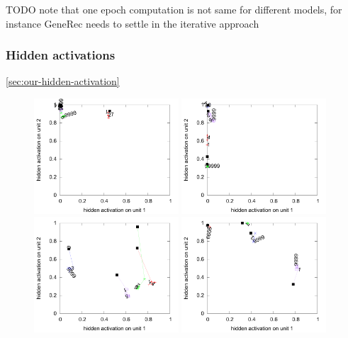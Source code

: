 TODO note that one epoch computation is not same for different models, for instance GeneRec needs to settle in the iterative approach 

\subsubsection{Hidden activations}
\ref{sec:our-hidden-activation}  


\begin{figure}[H]
  \centering
  \includegraphics[width=0.48\textwidth]{img/hid-bal-bad-init.pdf}  
  \includegraphics[width=0.48\textwidth]{img/hid-bal-bad-convex.pdf}  \\
  \includegraphics[width=0.48\textwidth]{img/hid-bal-bad-step.pdf}  
  \includegraphics[width=0.48\textwidth]{img/hid-bal-bad-stagnation.pdf}  \\

\end{figure}
